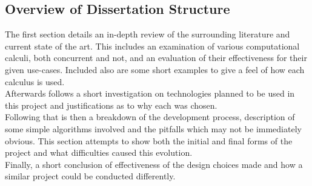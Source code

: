 \subsection{Overview of Dissertation Structure}
    The first section details an in-depth review of the surrounding literature and current state of the art.
    This includes an examination of various computational calculi, both concurrent and not, and an evaluation of their effectiveness for their given use-cases.
    Included also are some short examples to give a feel of how each calculus is used.\\

    Afterwards follows a short investigation on technologies planned to be used in this project and justifications as to why each was chosen.\\

    Following that is then a breakdown of the development process, description of some simple algorithms involved and the pitfalls which may not be immediately obvious.
    This section attempts to show both the initial and final forms of the project and what difficulties caused this evolution.\\

    Finally, a short conclusion of effectiveness of the design choices made and how a similar project could be conducted differently.\\

